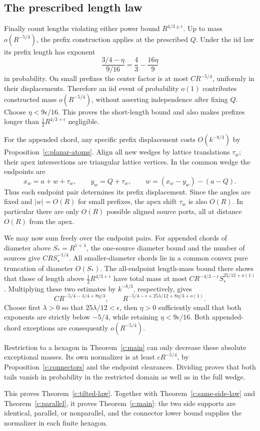 \subsection{The prescribed length law}
Finally count lengths violating either power bound
\(R^{4/3\pm\epsilon}\). Up to mass \(o(R^{-5/4})\), the prefix
construction applies at the prescribed \(Q\). Under the iid law its
prefix length has exponent
\[
 \frac{3/4-\eta}{9/16}=\frac43-\frac{16\eta}{9}
\]
in probability. On small prefixes the center factor is at most
\(CR^{-5/4}\), uniformly in their displacements. Therefore an iid
event of probability \(o(1)\) contributes constructed mass
\(o(R^{-5/4})\), without asserting independence after fixing \(Q\).
Choose \(\eta<9\epsilon/16\). This proves the short-length bound
and also makes prefixes longer than \(\frac12R^{4/3+\epsilon}\)
negligible.

For the appended chord, any specific prefix displacement costs
\(O(k^{-8/3})\) by Proposition~\ref{c:planar-atoms}. Align all new
wedges by lattice translations \(\tau_w\); their apex intersections
are triangular lattice vertices. In the common wedge the endpoints are
\[
 x_w=a+w+\tau_w,\qquad y_w=Q+\tau_w,
 \qquad w=(x_w-y_w)-(a-Q).
\]
Thus each endpoint pair determines its prefix displacement. Since the
angles are fixed and \(|w|=O(R)\) for small prefixes, the apex shift
\(\tau_w\) is also \(O(R)\). In particular there are only \(O(R)\)
possible aligned source ports, all at distance \(O(R)\) from the apex.

We may now sum freely over the endpoint pairs. For appended chords
of diameter above \(S_*=R^{1+\lambda}\), the one-source diameter
bound and the number of sources give \(CRS_*^{-1/4}\).
All smaller-diameter chords lie in a common convex pure truncation of
diameter \(O(S_*)\). The all-endpoint length-mass bound there shows
that those of length above \(\frac12R^{4/3+\epsilon}\) have total mass
at most \(CR^{-4/3-\epsilon}S_*^{25/12+o(1)}\).
Multiplying these two estimates by \(k^{-8/3}\), respectively, gives
\[
 CR^{-5/4-\lambda/4+8\eta/3},\qquad
 R^{-5/4-\epsilon+25\lambda/12+8\eta/3+o(1)}.
\]
Choose first \(\lambda>0\) so that \(25\lambda/12<\epsilon\), then
\(\eta>0\) sufficiently small that both exponents are strictly below
\(-5/4\), while retaining \(\eta<9\epsilon/16\). Both appended-chord
exceptions are consequently \(o(R^{-5/4})\).



Restriction to a hexagon in Theorem~\ref{c:main} can only decrease
these absolute exceptional masses. Its own normalizer is at least
\(cR^{-5/4}\), by Proposition~\ref{c:connectors} and the endpoint
clearances. Dividing proves that both tails vanish in probability
in the restricted domain as well as in the full wedge.

This proves Theorem~\ref{c:tilted-law}. Together with
Theorem~\ref{c:same-side-law} and Theorem~\ref{c:parallel}, it proves
Theorem~\ref{c:main}: the two side supports are identical, parallel, or
nonparallel, and the connector lower bound supplies the normalizer in
each finite hexagon.
